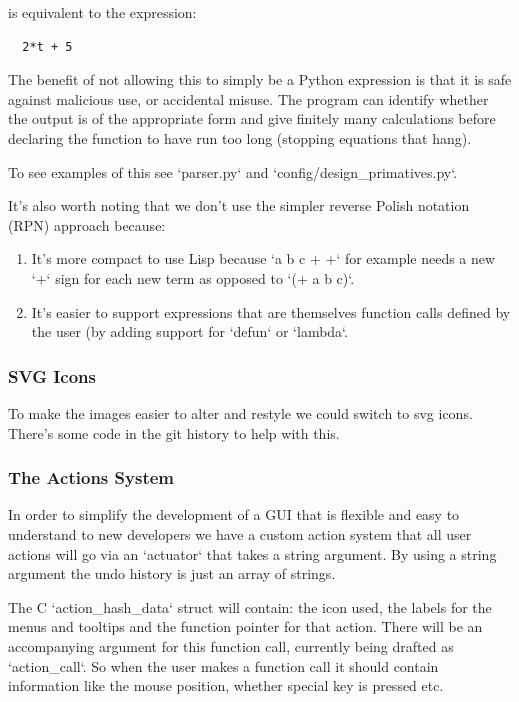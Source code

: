 \documentclass[a4paper, 11pt]{report}
\begin{document}
is equivalent to the expression:

\begin{verbatim}
  2*t + 5
\end{verbatim}

The benefit of not allowing this to simply be a Python expression
is that it is safe against malicious use, or accidental misuse.
The program can identify whether the output is of the appropriate
form and give finitely many calculations before declaring the
function to have run too long (stopping equations that hang).

To see examples of this see `parser.py` and
`config/design\_primatives.py`.

It's also worth noting that we don't use the simpler reverse Polish
notation (RPN) approach because:

\begin{enumerate}
\item It's more compact to use Lisp because `a b c + +` for example needs a new `+` sign for each new term as opposed to `(+ a b c)`.
\item It's easier to support expressions that are themselves function calls defined by the user (by adding support for `defun` or `lambda`.
\end{enumerate}

\subsubsection{SVG Icons}

To make the images easier to alter and restyle we could
switch to svg icons. There's some code in the git history
to help with this.

\subsubsection{The Actions System}

In order to simplify the development of a GUI that is flexible and
easy to understand to new developers we have a custom action system that all
user actions will go via an `actuator` that takes a string argument. By using a
string argument the undo history is just an array of strings.

The C `action\_hash\_data` struct will contain: the icon used, the labels for the
menus and tooltips and the function pointer for that action.
There will be an accompanying argument for this function call, currently being
drafted as `action\_call`. So when the user makes a function call it should
contain information like the mouse position, whether special key is pressed
etc.
\end{document}
